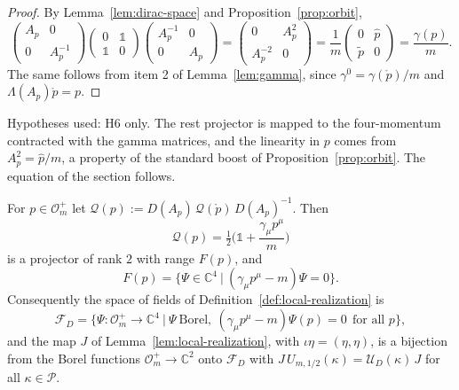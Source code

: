 \begin{proof}
	By Lemma~\ref{lem:dirac-space} and Proposition~\ref{prop:orbit},
	\begin{equation*}
		\begin{pmatrix}A_p&0\\0&A_p^{-1}\end{pmatrix}\begin{pmatrix}0&\mathbb{1}\\\mathbb{1}&0\end{pmatrix}\begin{pmatrix}A_p^{-1}&0\\0&A_p\end{pmatrix}=\begin{pmatrix}0&A_p^2\\A_p^{-2}&0\end{pmatrix}=\frac1m\begin{pmatrix}0&\hat{p}\\\tilde{p}&0\end{pmatrix}=\frac{\gamma(p)}{m}.
	\end{equation*}
	The same follows from item 2 of Lemma~\ref{lem:gamma}, since $\gamma^0=\gamma(\mathring{p})/m$ and $\Lambda(A_p)\mathring{p}=p$.
\end{proof}

\noindent Hypotheses used: H6 only. The rest projector is mapped to the four-momentum contracted with the gamma matrices, and the linearity in $p$ comes from $A_p^2=\hat{p}/m$, a property of the standard boost of Proposition~\ref{prop:orbit}. The equation of the section follows.

\begin{theorem}\label{thm:dirac}
	For $p\in\mathcal{O}_m^+$ let $\mathcal{Q}(p):=D(A_p)\,\mathcal{Q}(\mathring{p})\,D(A_p)^{-1}$. Then
	\begin{equation}\label{eq:covariant-projector}
		\mathcal{Q}(p)=\tfrac12\Big(\mathbb{1}+\frac{\gamma_\mu p^\mu}{m}\Big)
	\end{equation}
	is a projector of rank $2$ with range $F(p)$, and
	\begin{equation}\label{eq:dirac-momentum}
		F(p)=\big\{\Psi\in\mathbb{C}^4\ \big|\ (\gamma_\mu p^\mu-m)\Psi=0\big\}.
	\end{equation}
	Consequently the space of fields of Definition~\ref{def:local-realization} is
	\begin{equation*}
		\mathcal{F}_D=\big\{\Psi:\mathcal{O}_m^+\to\mathbb{C}^4\ \big|\ \Psi\ \text{Borel},\ (\gamma_\mu p^\mu-m)\Psi(p)=0\ \ \text{for all }p\big\},
	\end{equation*}
	and the map $J$ of Lemma~\ref{lem:local-realization}, with $\iota\eta=(\eta,\eta)$, is a bijection from the Borel functions $\mathcal{O}_m^+\to\mathbb{C}^2$ onto $\mathcal{F}_D$ with $J\,U_{m,1/2}(\kappa)=\mathcal{U}_D(\kappa)\,J$ for all $\kappa\in\mathcal{P}$.
\end{theorem}

